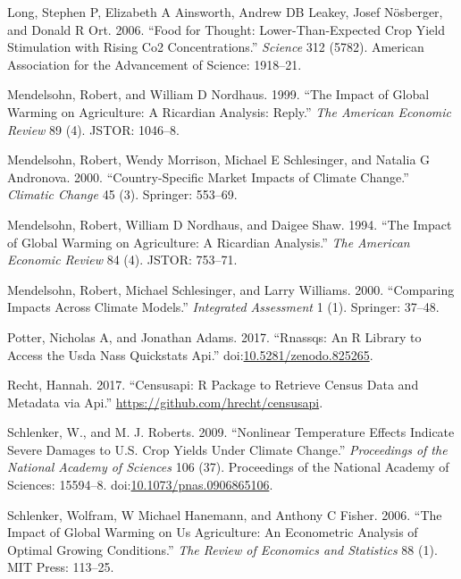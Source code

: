 \documentclass[AER]{AEA}
\begin{document}
\hypertarget{ref-LongETAL2006}{}
Long, Stephen P, Elizabeth A Ainsworth, Andrew DB Leakey, Josef
Nösberger, and Donald R Ort. 2006. ``Food for Thought:
Lower-Than-Expected Crop Yield Stimulation with Rising Co2
Concentrations.'' \emph{Science} 312 (5782). American Association for
the Advancement of Science: 1918--21.

\hypertarget{ref-MendelsohnNordhaus1999}{}
Mendelsohn, Robert, and William D Nordhaus. 1999. ``The Impact of Global
Warming on Agriculture: A Ricardian Analysis: Reply.'' \emph{The
American Economic Review} 89 (4). JSTOR: 1046--8.

\hypertarget{ref-MendelsohnETAL2000}{}
Mendelsohn, Robert, Wendy Morrison, Michael E Schlesinger, and Natalia G
Andronova. 2000. ``Country-Specific Market Impacts of Climate Change.''
\emph{Climatic Change} 45 (3). Springer: 553--69.

\hypertarget{ref-MendelsohnNordhausShaw1994}{}
Mendelsohn, Robert, William D Nordhaus, and Daigee Shaw. 1994. ``The
Impact of Global Warming on Agriculture: A Ricardian Analysis.''
\emph{The American Economic Review} 84 (4). JSTOR: 753--71.

\hypertarget{ref-MendelsohnSchlesingerWilliams2000}{}
Mendelsohn, Robert, Michael Schlesinger, and Larry Williams. 2000.
``Comparing Impacts Across Climate Models.'' \emph{Integrated
Assessment} 1 (1). Springer: 37--48.

\hypertarget{ref-rnassqs}{}
Potter, Nicholas A, and Jonathan Adams. 2017. ``Rnassqs: An R Library to
Access the Usda Nass Quickstats Api.''
doi:\href{https://doi.org/10.5281/zenodo.825265}{10.5281/zenodo.825265}.

\hypertarget{ref-censusapi}{}
Recht, Hannah. 2017. ``Censusapi: R Package to Retrieve Census Data and
Metadata via Api.'' \url{https://github.com/hrecht/censusapi}.

\hypertarget{ref-SchlenkerRoberts2009}{}
Schlenker, W., and M. J. Roberts. 2009. ``Nonlinear Temperature Effects
Indicate Severe Damages to U.S. Crop Yields Under Climate Change.''
\emph{Proceedings of the National Academy of Sciences} 106 (37).
Proceedings of the National Academy of Sciences: 15594--8.
doi:\href{https://doi.org/10.1073/pnas.0906865106}{10.1073/pnas.0906865106}.

\hypertarget{ref-SchlenkerHanemannFisher2006}{}
Schlenker, Wolfram, W Michael Hanemann, and Anthony C Fisher. 2006.
``The Impact of Global Warming on Us Agriculture: An Econometric
Analysis of Optimal Growing Conditions.'' \emph{The Review of Economics
and Statistics} 88 (1). MIT Press: 113--25.
\end{document}

